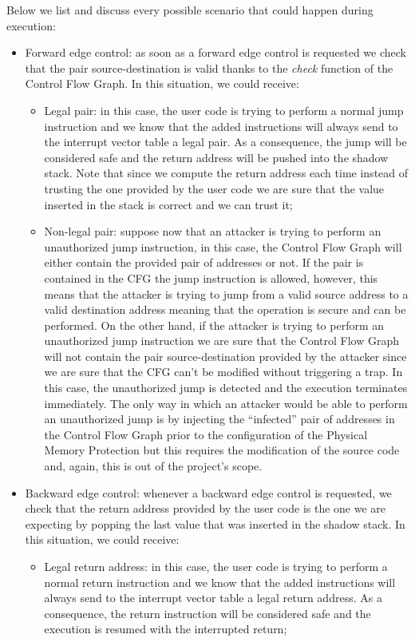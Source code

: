 Below we list and discuss every possible scenario that could happen during execution:
\begin{itemize}
  \item Forward edge control: as soon as a forward edge control is requested we
    check that the pair source-destination is valid thanks to the \textit{check}
    function of the Control Flow Graph. In this situation, we could receive:
    \begin{itemize}
      \item Legal pair: in this case, the user code is trying to perform a normal
        jump instruction and we know that the added instructions will always send
        to the interrupt vector table a legal pair. As a consequence, the jump will
        be considered safe and the return address will be pushed into the shadow
        stack. Note that since we compute the return address each time instead
        of trusting the one provided by the user code we are sure that the value
        inserted in the stack is correct and we can trust it;

      \item Non-legal pair: suppose now that an attacker is trying to perform an
        unauthorized jump instruction, in this case, the Control Flow Graph will
        either contain the provided pair of addresses or not. If the pair is contained
        in the CFG the jump instruction is allowed, however, this means that the
        attacker is trying to jump from a valid source address to a valid destination
        address meaning that the operation is secure and can be performed. On
        the other hand, if the attacker is trying to perform an unauthorized jump
        instruction we are sure that the Control Flow Graph will not contain the
        pair source-destination provided by the attacker since we are sure that the
        CFG can't be modified without triggering a trap. In this case, the unauthorized
        jump is detected and the execution terminates immediately. The only way
        in which an attacker would be able to perform an unauthorized jump is by
        injecting the ``infected'' pair of addresses in the Control Flow Graph
        prior to the configuration of the Physical Memory Protection but this
        requires the modification of the source code and, again, this is out of
        the project's scope.
    \end{itemize}

  \item Backward edge control: whenever a backward edge control is requested, we
    check that the return address provided by the user code is the one we are expecting
    by popping the last value that was inserted in the shadow stack. In this
    situation, we could receive:
    \begin{itemize}
      \item Legal return address: in this case, the user code is trying to perform
        a normal return instruction and we know that the added instructions will
        always send to the interrupt vector table a legal return address. As a
        consequence, the return instruction will be considered safe and the execution
        is resumed with the interrupted return;


\end{itemize}
\end{itemize}
